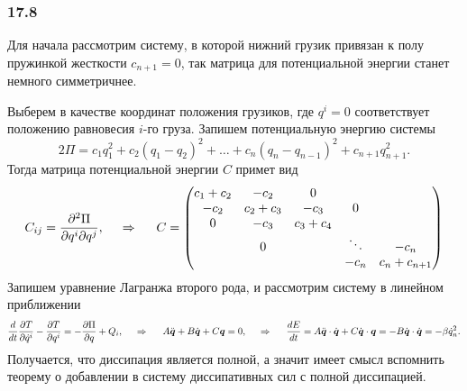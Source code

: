 \subsubsection*{17.8}


Для начала рассмотрим систему, в которой нижний грузик привязан к полу пружинкой жесткости $c_{n+1} = 0$, так матрица для потенциальной энергии станет немного симметричнее. 

Выберем в качестве координат положения грузиков, где $q^i = 0$ соответствует положению равновесия $i$-го груза.  
Запишем потенциальную энергию системы
\begin{equation*}
    2 \Pi = c_1 q_1^2 + c_2(q_1-q_2)^2 + \ldots + c_n (q_n-q_{n-1})^2 + c_{n+1} q_{n+1}^2.
\end{equation*}
Тогда матрица потенциальной энергии $C$ примет вид
\begin{equation*}
    C_{ij} = \frac{\partial^2 \Pi}{\partial q^i \partial q^j},
    \hspace{0.5cm} \Rightarrow \hspace{0.5cm}
    C = \begin{pmatrix}
        c_1 + c_2 & -c_2 & 0 &  &  \\
        -c_2 & c_2 + c_3 & -c_3 & 0 &  \\
        0 & -c_3 & c_3 + c_4 &  &   \\
         & 0 &  & \ddots & -c_n \\
         &  &  & -c_n & c_n + c_{n+1}
    \end{pmatrix}
\end{equation*}
Запишем уравнение Лагранжа второго рода, и рассмотрим систему в линейном приближении
\begin{equation*}
    \frac{d }{d t} \frac{\partial T}{\partial \dot{q}^i} - \frac{\partial T}{\partial q^i}
     = - \frac{\partial \Pi}{\partial q} + Q_i,
     \hspace{0.5cm} \Rightarrow \hspace{0.5cm}
     A \ddot{\mbox{\boldmath $q$}} + B \dot{\mbox{\boldmath $q$}} + C \mbox{\boldmath $q$} = 0,
     \hspace{0.5cm} \Rightarrow \hspace{0.5cm}
     \frac{d E}{d t} =
     A \ddot{\mbox{\boldmath $q$}} \cdot \dot{\mbox{\boldmath $q$}} + C \dot{\mbox{\boldmath $q$}} \cdot \mbox{\boldmath $q$} = - B \dot{\mbox{\boldmath $q$}} \cdot \dot{\mbox{\boldmath $q$}} = - \beta \dot{q}_n^2.
\end{equation*}
Получается, что диссипация является полной, а значит имеет смысл вспомнить теорему о добавлении в систему диссипативных сил с полной диссипацией.


